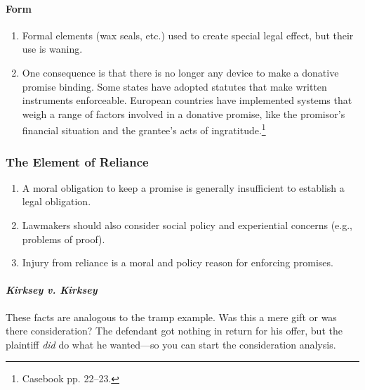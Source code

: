 \paragraph{Form}

\begin{enumerate}
    \item Formal elements (wax seals, etc.) used to create special legal 
    effect, but their use is waning.
    \item One consequence is that there is no longer any device to make a 
    donative promise binding. Some states have adopted statutes that make 
    written instruments enforceable. European countries have implemented 
    systems that weigh a range of factors involved in a donative promise, like 
    the promisor's financial situation and the grantee's acts of 
    ingratitude.\footnote{Casebook pp. 22--23.}
\end{enumerate}

\subsubsection{The Element of Reliance}

\begin{enumerate}
    \item A moral obligation to keep a promise is generally insufficient to 
    establish a legal obligation.
    \item Lawmakers should also consider social policy and experiential 
    concerns (e.g., problems of proof).
    \item Injury from reliance is a moral and policy reason for enforcing 
    promises.
\end{enumerate}

\paragraph{\emph{Kirksey v. Kirksey}}

These facts are analogous to the tramp example. Was this a mere gift or was 
there consideration? The defendant got nothing in return for his offer, but 
the plaintiff \emph{did} do what he wanted---so you can start the 
consideration analysis.

